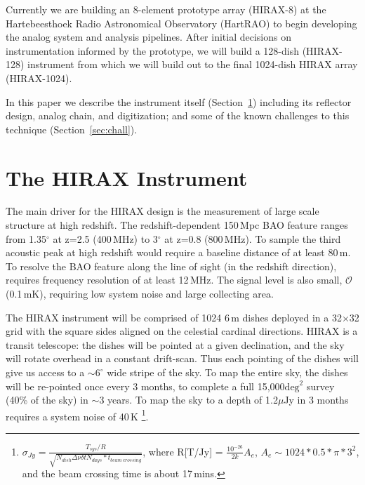 \documentclass[]{spie}  %
\begin{document}
Currently we are building an 8-element prototype array (HIRAX-8) at the Hartebeesthoek Radio Astronomical Observatory (HartRAO) to begin developing the analog system and analysis pipelines. After initial decisions on instrumentation informed by the prototype, we will build a 128-dish (HIRAX-128) instrument from which we will build out to the final 1024-dish HIRAX array (HIRAX-1024). \newline

In this paper we describe the instrument itself (Section~\ref{sec:instru}) including its reflector design, analog chain, and digitization; and some of the known challenges to this technique (Section~\ref{sec:chall}).


\section{The HIRAX Instrument}
\label{sec:instru}

The main driver for the HIRAX design is the measurement of large scale structure at high redshift. The redshift-dependent 150\,Mpc BAO feature ranges from 1.35$^{\circ}$ at z=2.5 (400\,MHz) to 3$^{\circ}$ at z=0.8 (800\,MHz). To sample the third acoustic peak at high redshift would require a baseline distance of at least 80\,m. To resolve the BAO feature along the line of sight (in the redshift direction), requires frequency resolution of at least 12\,MHz. The signal level is also small, $\mathcal{O}$(0.1\,mK), requiring low system noise and large collecting area. \newline 

The HIRAX instrument will be comprised of 1024 6\,m dishes deployed in a 32$\times$32 grid with the square sides aligned on the celestial cardinal directions. HIRAX is a transit telescope: the dishes will be pointed at a given declination, and the sky will rotate overhead in a constant drift-scan. Thus each pointing of the dishes will give us access to a $\sim6^{\circ}$ wide stripe of the sky. To map the entire sky, the dishes will be re-pointed once every 3 months, to complete a full 15,000$\mathrm{deg}^{2}$ survey (40\% of the sky) in $\sim$3 years. To map the sky to a depth of 1.2$\mu$Jy in 3 months requires a system noise of 40\,K \footnote {$\sigma_{Jy} = \frac{T_{sys} / R }{\sqrt{N_{dish} \Delta\nu \delta t N_{days}*t_{beam~crossing}}}$, where R[T/Jy] = $\frac{10^{-26}}{2k}A_{e}$, $A_{e}\sim1024*0.5*\pi*3^{2}$, and the beam crossing time is about 17\,mins. }. 
\newline
\end{document}

